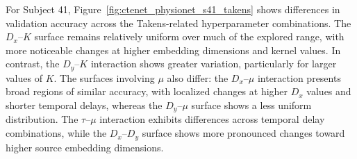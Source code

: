 For Subject 41, Figure~\ref{fig:ctenet_physionet_s41_takens} shows differences in validation accuracy across the Takens-related hyperparameter combinations. The $D_x$--$K$ surface remains relatively uniform over much of the explored range, with more noticeable changes at higher embedding dimensions and kernel values. In contrast, the $D_y$--$K$ interaction shows greater variation, particularly for larger values of $K$. The surfaces involving $\mu$ also differ: the $D_x$--$\mu$ interaction presents broad regions of similar accuracy, with localized changes at higher $D_x$ values and shorter temporal delays, whereas the $D_y$--$\mu$ surface shows a less uniform distribution. The $\tau$--$\mu$ interaction exhibits differences across temporal delay combinations, while the $D_x$--$D_y$ surface shows more pronounced changes toward higher source embedding dimensions.
